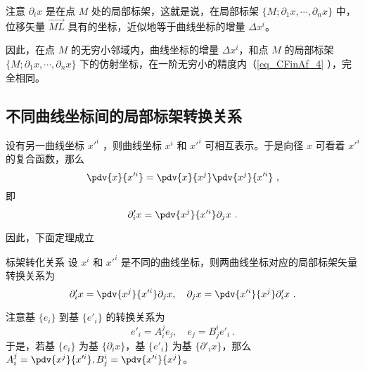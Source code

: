 注意 $\partial_i x$ 是在点 $M$ 处的局部标架，这就是说，在局部标架 $\{M;\partial_1 x,\cdots,\partial_n x\}$ 中，位移矢量 $\overrightarrow{ML}$ 具有的坐标，近似地等于曲线坐标的增量 $\Delta x^i$。

因此，在点 $M$ 的无穷小邻域内，曲线坐标的增量 $\Delta x^i$，和点 $M$ 的局部标架 $\{M;\partial_1 x,\cdots,\partial_n x\}$ 下的仿射坐标，在一阶无穷小的精度内（\autoref{eq_CFinAf_4} ），完全相同。

\subsection{不同曲线坐标间的局部标架转换关系}\label{sub_CFinAf_1}

设有另一曲线坐标 $x'^i$ ，则曲线坐标 $x^i$ 和 $x'^i$ 可相互表示。于是向径 $x$ 可看着 $x'^i$ 的复合函数，那么
\begin{equation}
\pdv{x}{x'^i}=\pdv{x}{x^j}\pdv{x^j}{x'^i}~,
\end{equation}
 即
 \begin{equation}
 \partial'_i x=\pdv{x^j}{x'^i}\partial_j x~.
 \end{equation}
 
因此，下面定理成立
\begin{theorem}{标架转化关系}
设 $x^i$ 和 $x'^i$ 是不同的曲线坐标，则两曲线坐标对应的局部标架矢量转换关系为
\begin{equation}\label{eq_CFinAf_5}
\partial'_i x=\pdv{x^j}{x'^i}\partial_j x,\quad \partial_j x=\pdv{x'^i}{x^j}\partial'_i x~.
\end{equation}
\end{theorem}
注意基 $\{e_i\}$ 到基 $\{e'_i\}$ 的转换关系为
\begin{equation}
e'_i=A^j_i e_j,\quad e_j=B^i_j e'_i~.
\end{equation}
于是，若基 $\{e_i\}$ 为基 $\{\partial_i x\}$，基 $\{e'_i\}$ 为基 $\{\partial'_i x\}$，那么 $A^j_i=\pdv{x^j}{x'^i},B^i_j=\pdv{x'^i}{x^j}$。